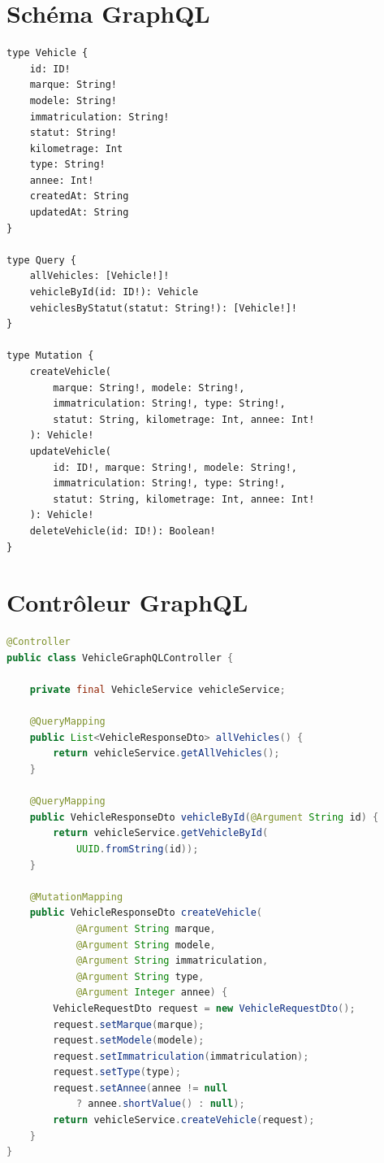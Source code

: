 \documentclass[12pt,a4paper]{report}
\begin{document}
\section{Sch\'ema GraphQL}

\begin{lstlisting}[style=graphqlstyle, caption={schema.graphqls}]
type Vehicle {
    id: ID!
    marque: String!
    modele: String!
    immatriculation: String!
    statut: String!
    kilometrage: Int
    type: String!
    annee: Int!
    createdAt: String
    updatedAt: String
}

type Query {
    allVehicles: [Vehicle!]!
    vehicleById(id: ID!): Vehicle
    vehiclesByStatut(statut: String!): [Vehicle!]!
}

type Mutation {
    createVehicle(
        marque: String!, modele: String!,
        immatriculation: String!, type: String!,
        statut: String, kilometrage: Int, annee: Int!
    ): Vehicle!
    updateVehicle(
        id: ID!, marque: String!, modele: String!,
        immatriculation: String!, type: String!,
        statut: String, kilometrage: Int, annee: Int!
    ): Vehicle!
    deleteVehicle(id: ID!): Boolean!
}
\end{lstlisting}

\section{Contr\^oleur GraphQL}

\begin{lstlisting}[style=javastyle, language=Java, caption={Extrait de VehicleGraphQLController.java}]
@Controller
public class VehicleGraphQLController {

    private final VehicleService vehicleService;

    @QueryMapping
    public List<VehicleResponseDto> allVehicles() {
        return vehicleService.getAllVehicles();
    }

    @QueryMapping
    public VehicleResponseDto vehicleById(@Argument String id) {
        return vehicleService.getVehicleById(
            UUID.fromString(id));
    }

    @MutationMapping
    public VehicleResponseDto createVehicle(
            @Argument String marque,
            @Argument String modele,
            @Argument String immatriculation,
            @Argument String type,
            @Argument Integer annee) {
        VehicleRequestDto request = new VehicleRequestDto();
        request.setMarque(marque);
        request.setModele(modele);
        request.setImmatriculation(immatriculation);
        request.setType(type);
        request.setAnnee(annee != null
            ? annee.shortValue() : null);
        return vehicleService.createVehicle(request);
    }
}
\end{lstlisting}
\end{document}

